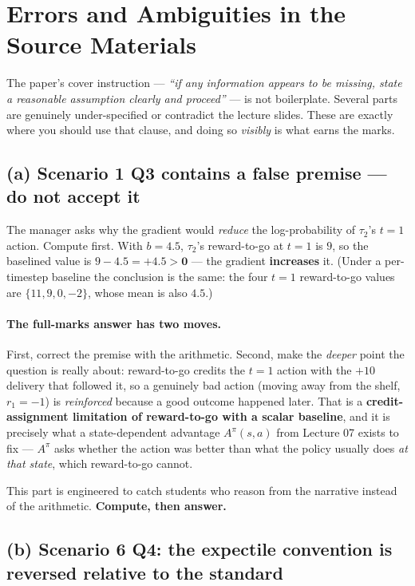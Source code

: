 \documentclass[11pt,a4paper]{article}
\begin{document}
\newpage
\section{Errors and Ambiguities in the Source Materials}
\label{sec:errata}

The paper's cover instruction --- \emph{``if any information appears to be
missing, state a reasonable assumption clearly and proceed''} --- is not
boilerplate. Several parts are genuinely under-specified or contradict the
lecture slides. These are exactly where you should use that clause, and doing
so \emph{visibly} is what earns the marks.

\subsection{(a) Scenario 1 Q3 contains a false premise --- do not accept it}

The manager asks why the gradient would \emph{reduce} the log-probability of
$\tau_2$'s $t=1$ action. Compute first. With $b=4.5$, $\tau_2$'s reward-to-go
at $t=1$ is $9$, so the baselined value is $9-4.5=\mathbf{+4.5>0}$ --- the
gradient \textbf{increases} it. (Under a per-timestep baseline the conclusion
is the same: the four $t=1$ reward-to-go values are $\{11,9,0,-2\}$, whose
mean is also $4.5$.)

\paragraph{The full-marks answer has two moves.} First, correct the premise
with the arithmetic. Second, make the \emph{deeper} point the question is
really about: reward-to-go credits the $t=1$ action with the $+10$ delivery
that followed it, so a genuinely bad action (moving away from the shelf,
$r_1=-1$) is \emph{reinforced} because a good outcome happened later. That is
a \textbf{credit-assignment limitation of reward-to-go with a scalar
baseline}, and it is precisely what a state-dependent advantage
$A^\pi(s,a)$ from Lecture 07 exists to fix --- $A^\pi$ asks whether the action
was better than what the policy usually does \emph{at that state}, which
reward-to-go cannot.

This part is engineered to catch students who reason from the narrative
instead of the arithmetic. \textbf{Compute, then answer.}

\subsection{(b) Scenario 6 Q4: the expectile convention is reversed relative to the standard}
\end{document}
